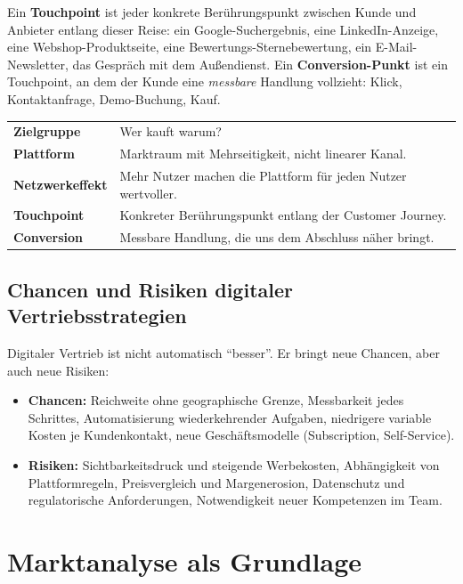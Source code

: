 \documentclass[11pt,a4paper,oneside]{article}
\newcommand{\fachbegriff}[1]{\textbf{#1}}
\begin{document}
Ein \fachbegriff{Touchpoint} ist jeder konkrete Berührungspunkt zwischen Kunde und Anbieter entlang dieser Reise: ein Google-Suchergebnis, eine LinkedIn-Anzeige, eine Webshop-Produktseite, eine Bewertungs-Sternebewertung, ein E-Mail-Newsletter, das Gespräch mit dem Außendienst. Ein \fachbegriff{Conversion-Punkt} ist ein Touchpoint, an dem der Kunde eine \emph{messbare} Handlung vollzieht: Klick, Kontaktanfrage, Demo-Buchung, Kauf.

\begin{merkbox}
\begin{tabularx}{\linewidth}{@{}>{\bfseries}lX@{}}
\toprule
Zielgruppe & Wer kauft warum? \\
Plattform & Marktraum mit Mehrseitigkeit, nicht linearer Kanal. \\
Netzwerkeffekt & Mehr Nutzer machen die Plattform für jeden Nutzer wertvoller. \\
Touchpoint & Konkreter Berührungspunkt entlang der Customer Journey. \\
Conversion & Messbare Handlung, die uns dem Abschluss näher bringt. \\
\bottomrule
\end{tabularx}
\end{merkbox}

\subsection{Chancen und Risiken digitaler Vertriebsstrategien}

Digitaler Vertrieb ist nicht automatisch ``besser''. Er bringt neue Chancen, aber auch neue Risiken:

\begin{itemize}
  \item \textbf{Chancen:} Reichweite ohne geographische Grenze, Messbarkeit jedes Schrittes, Automatisierung wiederkehrender Aufgaben, niedrigere variable Kosten je Kundenkontakt, neue Geschäftsmodelle (Subscription, Self-Service).
  \item \textbf{Risiken:} Sichtbarkeitsdruck und steigende Werbekosten, Abhängigkeit von Plattformregeln, Preisvergleich und Margenerosion, Datenschutz und regulatorische Anforderungen, Notwendigkeit neuer Kompetenzen im Team.
\end{itemize}

\section{Marktanalyse als Grundlage}
\end{document}

